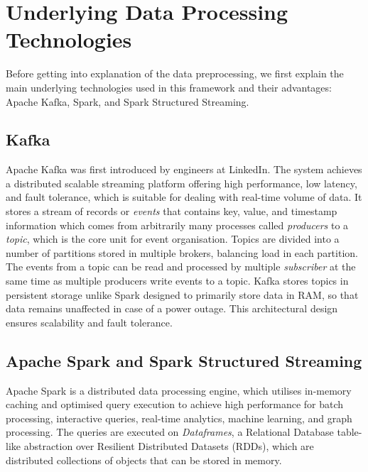 \documentclass[11pt]{uonthesis}
\begin{document}
\section{Underlying Data Processing Technologies}
Before getting into explanation of the data preprocessing, we first explain the main underlying technologies used in this framework and their advantages: Apache Kafka, Spark, and Spark Structured Streaming.

\subsection{Kafka}

Apache Kafka \cite{Kreps2011KafkaA} was first introduced by engineers at LinkedIn. The system achieves a distributed scalable streaming platform offering high performance, low latency, and fault tolerance, which is suitable for dealing with real-time volume of data. It stores a stream of records or \textit{events} that contains key, value, and timestamp information which comes from arbitrarily many processes called \textit{producers} to a \textit{topic}, which is the core unit for event organisation. Topics are divided into a number of partitions stored in multiple brokers, balancing load in each partition. The events from a topic can be read and processed by multiple \textit{subscriber} at the same time as multiple producers write events to a topic. Kafka stores topics in persistent storage unlike Spark designed to primarily store data in RAM, so that data remains unaffected in case of a power outage. This architectural design ensures scalability and fault tolerance. 

\subsection{Apache Spark and Spark Structured Streaming}

Apache Spark is a distributed data processing engine, which utilises in-memory caching and optimised query execution to achieve high performance for batch processing, interactive queries, real-time analytics, machine learning, and graph processing. The queries are executed on \textit{Dataframes}, a Relational Database table-like abstraction over Resilient Distributed Datasets (RDDs), which are distributed collections of objects that can be stored in memory.
\end{document}

